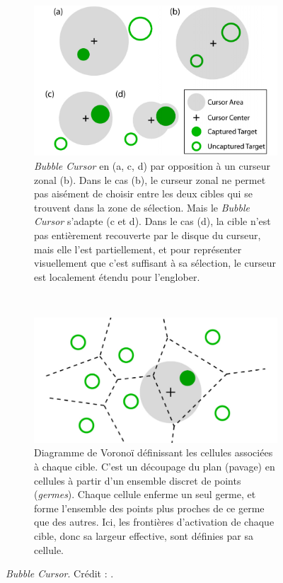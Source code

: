 	\begin{figure}[!htb]
		\begin{subfigure}[t]{0.49\textwidth}
			\centering
			\includegraphics[width=\textwidth]{figures/ch2/bubble}
			\caption{\emph{Bubble Cursor} en (a, c, d) par opposition à un curseur zonal (b). Dans le cas (b), le curseur zonal ne permet pas aisément de choisir entre les deux cibles qui se trouvent dans la zone de sélection. Mais le \emph{Bubble Cursor} s'adapte (c et d). Dans le cas (d), la cible n'est pas entièrement recouverte par le disque du curseur, mais elle l'est partiellement, et pour représenter visuellement que c'est suffisant à sa sélection, le curseur est localement étendu pour l'englober.}
			\label{fig:bubble}
		\end{subfigure}
		~
		\begin{subfigure}[t]{0.49\textwidth}
			\centering
			\includegraphics[width=\textwidth]{figures/ch2/voronoi}
			\caption{Diagramme de Voronoï définissant les cellules associées à chaque cible. C'est un découpage du plan (pavage) en cellules à partir d'un ensemble discret de points (\emph{germes}). Chaque cellule enferme un seul germe, et forme l'ensemble des points plus proches de ce germe que des autres. Ici, les frontières d'activation de chaque cible, donc sa largeur effective, sont définies par sa cellule.}
			\label{fig:voronoi}
		\end{subfigure}
		\caption[\emph{Bubble Cursor}]{\emph{Bubble Cursor}. Crédit : \cite{grossman2005bubble}.}
		\label{fig:bubbleVoronoi}
	\end{figure}
	
